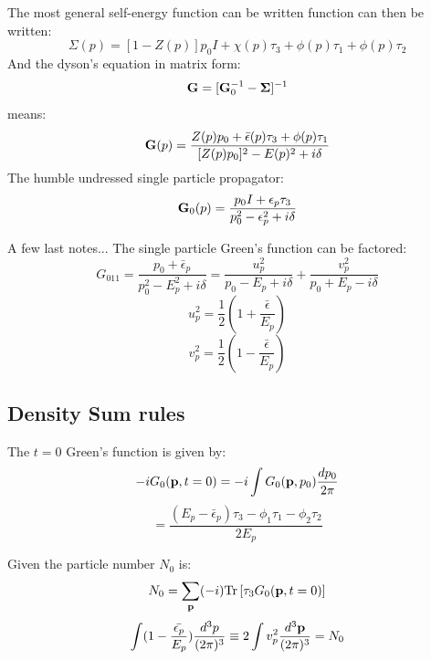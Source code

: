 \documentclass{article}
\def\G{{\bf G}}
\def\p{{\bf p}}
\begin{document}
The most general self-energy function can be written function can then be written:
%
\begin{equation}
\Sigma(p) = [1-Z(p)]p_{0}I + \chi(p)\tau_{3} + \phi(p)\tau_{1} + \phi(p)\tau_{2}
\end{equation}
%
And the dyson's equation in matrix form:
%
\begin{equation}
\G = [\G_0^{-1} - \mathbf{\Sigma}]^{-1}
\end{equation}
%
means:
%
\begin{equation}
\G(p) = \frac{Z(p)p_{0}+\bar{\epsilon}(p)\tau_{3}+\phi(p)\tau_{1}}{[Z(p)p_{0}]^{2} - E(p)^{2} + i\delta}
\end{equation}
%
The humble undressed single particle propagator:
%
\begin{equation}
\G_{0}(p) = \frac{p_{0}I + \epsilon_{p}\tau_{3}}{p^{2}_{0} - \epsilon^{2}_{p} + i\delta}
\end{equation}

A few last notes... The single particle Green's function can be factored:
%
\begin{equation}
G_{011} =  \frac{p_{0} + \bar{\epsilon}_{p}}{p_{0}^{2} - E_{p}^{2} + i\delta} = 
\frac{u_{p}^{2}}{p_{0} - E_{p} + i\delta} + \frac{v_{p}^{2}}{p_{0} + E_{p} - i\delta}
\end{equation}
%
\begin{equation}
u_{p}^{2} = \frac{1}{2}(1 + \frac{\bar{\epsilon}}{E_{p}})
\end{equation}
%
\begin{equation}
v_{p}^{2} = \frac{1}{2}(1 - \frac{\bar{\epsilon}}{E_{p}})
\end{equation}

\subsection{Density Sum rules}
The $t=0$ Green's function is given by:
%
\begin{equation} 
-iG_{0}(\p , t=0) =  -i\int G_{0}(\p,p_{0}) \frac{d p_{0}}{2\pi}
\end{equation}
%
\begin{equation} 
\label{eq:gred}
= \frac{ (E_{p} - \bar{\epsilon}_{p})\tau_{3} - \phi_{1}\tau_{1} - \phi_{2}\tau_{2}}{2E_{p}}
\end{equation}

Given the particle number $N_{0}$ is:
%
\begin{equation}
N_{0} = \sum_{\p} (-i) {\rm Tr}\left[\tau_{3}G_{0}(\p, t=0)\right]
\end{equation}
%
\begin{equation}
\int(1- \frac{\bar{\epsilon_{p}}}{E_{p}})\frac{d^{3}p}{(2\pi)^{3}} 
\equiv 2\int v_{p}^{2}\frac{d^{3}\p}{(2\pi)^{3}} = N_{0}
\end{equation}
\end{document}
